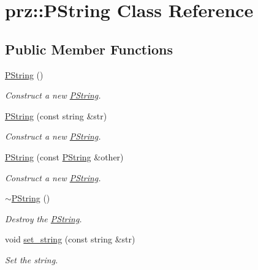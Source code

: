 \hypertarget{classprz_1_1_p_string}{}\section{prz\+::P\+String Class Reference}
\label{classprz_1_1_p_string}
\subsection*{Public Member Functions}
\begin{DoxyCompactItemize}
\item 
\mbox{\hyperlink{classprz_1_1_p_string_a49c184bdacf058b300fbcbb2f1dabb73}{P\+String}} ()
\begin{DoxyCompactList}\small\item\em Construct a new \mbox{\hyperlink{classprz_1_1_p_string}{P\+String}}. \end{DoxyCompactList}\item 
\mbox{\hyperlink{classprz_1_1_p_string_a49564845487998ce0fe4062df21dd857}{P\+String}} (const string \&str)
\begin{DoxyCompactList}\small\item\em Construct a new \mbox{\hyperlink{classprz_1_1_p_string}{P\+String}}. \end{DoxyCompactList}\item 
\mbox{\hyperlink{classprz_1_1_p_string_ae72acc504d808db97ea7a35db14ff36a}{P\+String}} (const \mbox{\hyperlink{classprz_1_1_p_string}{P\+String}} \&other)
\begin{DoxyCompactList}\small\item\em Construct a new \mbox{\hyperlink{classprz_1_1_p_string}{P\+String}}. \end{DoxyCompactList}\item 
\mbox{\hyperlink{classprz_1_1_p_string_a5859e66659c9db811447d97a9de9e976}{$\sim$\+P\+String}} ()
\begin{DoxyCompactList}\small\item\em Destroy the \mbox{\hyperlink{classprz_1_1_p_string}{P\+String}}. \end{DoxyCompactList}\item 
void \mbox{\hyperlink{classprz_1_1_p_string_afcef04054a81bea83bca47ea3eb2a625}{set\+\_\+string}} (const string \&str)
\begin{DoxyCompactList}\small\item\em Set the string. \end{DoxyCompactList}\item 

\end{DoxyCompactItemize}
